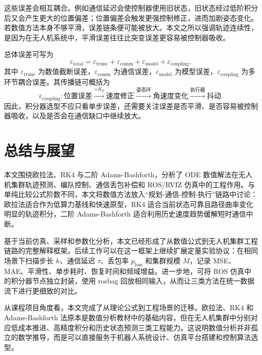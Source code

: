 \documentclass[UTF8,zihao=-4]{ctexart}
\begin{document}
这些误差会相互耦合。例如通信延迟会使控制器使用旧状态，旧状态经过低阶积分后又会产生更大的位置偏差；位置偏差会触发更强控制修正，进而加剧姿态变化。若数值方法本身不够平滑，误差链条便可能被放大。本文之所以强调轨迹连续性，是因为在无人机系统中，平滑误差往往比突变误差更容易被控制器吸收。

总体误差可写为
\begin{equation}
  \varepsilon_{\mathrm{total}}=
  \varepsilon_{\mathrm{trunc}}+\varepsilon_{\mathrm{comm}}+\varepsilon_{\mathrm{model}}+\varepsilon_{\mathrm{coupling}},
  \label{eq:total-error}
\end{equation}
其中 $\varepsilon_{\mathrm{trunc}}$ 为数值截断误差，$\varepsilon_{\mathrm{comm}}$ 为通信误差，$\varepsilon_{\mathrm{model}}$ 为模型误差，$\varepsilon_{\mathrm{coupling}}$ 为多环节耦合误差。其传播链可概括为
\begin{equation}
  \varepsilon_{\mathrm{coupling}}:
  \text{位置误差}\xrightarrow{\times K_p}\text{速度修正}
  \xrightarrow{\text{姿态环}}\text{角速度变化}
  \xrightarrow{\text{执行器}}\text{抖动}.
  \label{eq:error-chain}
\end{equation}
因此，积分器选型不应只看单步误差，还需要关注误差是否平滑、是否容易被控制器吸收，以及是否会在通信缺口中继续放大。

\section{总结与展望}

本文围绕欧拉法、RK4 与二阶 Adams-Bashforth，分析了 ODE 数值解法在无人机集群轨迹预测、编队控制、通信丢包补偿和 ROS/RVIZ 仿真中的工程作用。与单纯比较公式阶数不同，本文将数值方法放入“规划-通信-控制-执行”链路中讨论：欧拉法适合作为低算力基线和快速原型，RK4 适合当前状态可靠且路径曲率变化明显的轨迹积分，二阶 Adams-Bashforth 适合利用历史速度趋势缓解短时通信中断。

基于当前仿真、采样和参数化分析，本文已经形成了从数值公式到无人机集群工程链路的完整解释框架。后续工作可以在这一框架上继续扩展定量实验协议：在相同场景下扫描步长 $h$、通信延迟 $\tau$、丢包率 $p_{\mathrm{loss}}$ 和集群规模 $M$，记录 MSE、MAE、平滑性、单步耗时、恢复时间和频域增益。进一步地，可将 ROS 仿真中的积分器节点独立封装，使用 rosbag 回放相同输入，从而让三类方法在统一数据流下进行更细致的对比。

从课程项目角度看，本文完成了从理论公式到工程场景的迁移。欧拉法、RK4 和 Adams-Bashforth 法原本是数值分析教材中的基础内容，但在无人机集群中分别对应低成本推进、高精度积分和历史状态预测三类工程能力。这说明数值分析并非孤立的数学推导，而是可以直接服务于机器人系统设计、仿真平台搭建和控制算法选型。
\end{document}
